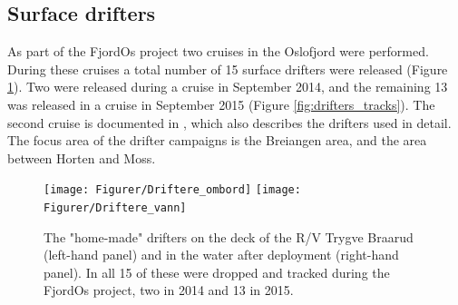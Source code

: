 \subsection{Surface drifters}
\label{subsec:drifto}
As part of the FjordOs project two cruises in the Oslofjord were performed. During these cruises a total number of 15 surface drifters were released (Figure \ref{fig:drifters_design}). Two were released during a cruise in September 2014, and the remaining 13 was released in a cruise in September 2015 (Figure \ref{fig:drifters_tracks}). The second cruise is documented in \cite{hjelm:etal:2016}, which also describes the drifters used in detail. The focus area of the drifter campaigns is the Breiangen area, and the area between Horten and Moss.

\begin{figure}[ht]
	\centerline{
		\texttt{[image: Figurer/Driftere\_ombord]}
		\texttt{[image: Figurer/Driftere\_vann]}
		}
	\caption{\small The "home-made" drifters on the deck of the R/V Trygve Braarud (left-hand panel) and in the water after deployment (right-hand panel). In all 15 of these were dropped and tracked during the FjordOs project, two in 2014 and 13 in 2015.}
	\label{fig:drifters_design}
\end{figure}

